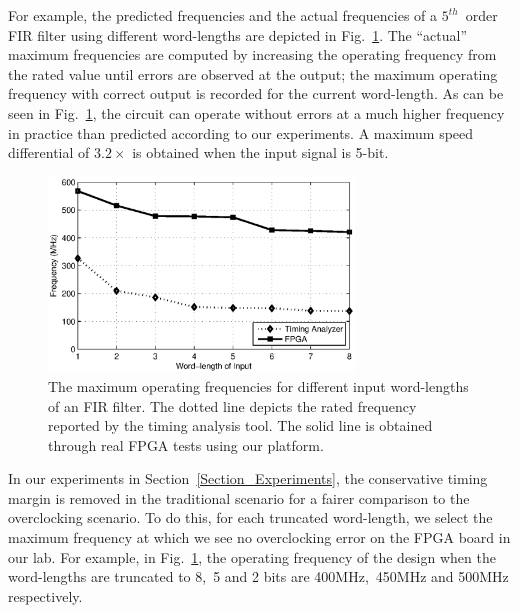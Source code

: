 \documentclass[journal]{IEEEtran}
\begin{document}
For example, the predicted frequencies and the actual frequencies of a $5^{th}$~order FIR filter using different word-lengths are depicted in Fig.~\ref{TimingMargin}. The ``actual'' maximum frequencies are computed by increasing the operating frequency from the rated value until errors are observed at the output; the maximum operating frequency with correct output is recorded for the current word-length. As can be seen in Fig.~\ref{TimingMargin}, the circuit can operate without errors at a much higher frequency in practice than predicted according to our experiments. A maximum speed differential of $3.2\times$ is obtained when the input signal is 5-bit.

\begin{figure}[t]
  \centering
  \includegraphics[width=3.2in]{./Figures/Exp/FIR/RatedFrequency3.eps}
  \caption{The maximum operating frequencies for different input word-lengths of an FIR filter. The dotted line depicts the rated frequency reported by the timing analysis tool. The solid line is obtained through real FPGA tests using our platform.}
  \label{TimingMargin}
\end{figure}

In our experiments in Section~\ref{Section_Experiments}, the conservative timing margin is removed in the traditional scenario for a fairer comparison to the overclocking scenario. To do this, for each truncated word-length, we select the maximum frequency at which we see no overclocking error on the FPGA board in our lab. For example, in Fig.~\ref{TimingMargin}, the operating frequency of the design when the word-lengths are truncated to 8,~5 and 2 bits are 400MHz,~450MHz and 500MHz respectively.
\end{document}
